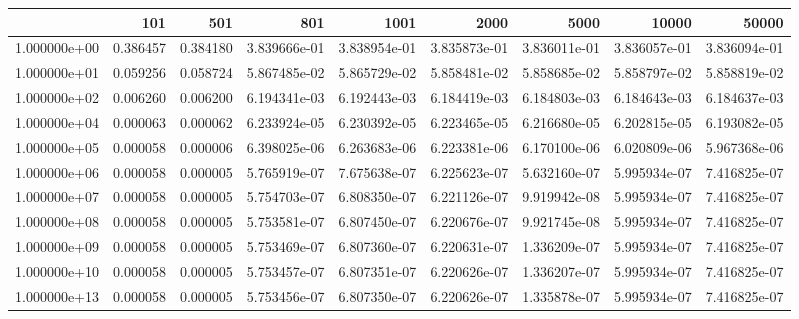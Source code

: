 \begin{tabular}{lrrrrrrrr}
\toprule
{} &     101   &     501   &         801   &         1001  &         2000  &         5000  &         10000 &         50000 \\
\midrule
1.000000e+00 &  0.386457 &  0.384180 &  3.839666e-01 &  3.838954e-01 &  3.835873e-01 &  3.836011e-01 &  3.836057e-01 &  3.836094e-01 \\
1.000000e+01 &  0.059256 &  0.058724 &  5.867485e-02 &  5.865729e-02 &  5.858481e-02 &  5.858685e-02 &  5.858797e-02 &  5.858819e-02 \\
1.000000e+02 &  0.006260 &  0.006200 &  6.194341e-03 &  6.192443e-03 &  6.184419e-03 &  6.184803e-03 &  6.184643e-03 &  6.184637e-03 \\
1.000000e+04 &  0.000063 &  0.000062 &  6.233924e-05 &  6.230392e-05 &  6.223465e-05 &  6.216680e-05 &  6.202815e-05 &  6.193082e-05 \\
1.000000e+05 &  0.000058 &  0.000006 &  6.398025e-06 &  6.263683e-06 &  6.223381e-06 &  6.170100e-06 &  6.020809e-06 &  5.967368e-06 \\
1.000000e+06 &  0.000058 &  0.000005 &  5.765919e-07 &  7.675638e-07 &  6.225623e-07 &  5.632160e-07 &  5.995934e-07 &  7.416825e-07 \\
1.000000e+07 &  0.000058 &  0.000005 &  5.754703e-07 &  6.808350e-07 &  6.221126e-07 &  9.919942e-08 &  5.995934e-07 &  7.416825e-07 \\
1.000000e+08 &  0.000058 &  0.000005 &  5.753581e-07 &  6.807450e-07 &  6.220676e-07 &  9.921745e-08 &  5.995934e-07 &  7.416825e-07 \\
1.000000e+09 &  0.000058 &  0.000005 &  5.753469e-07 &  6.807360e-07 &  6.220631e-07 &  1.336209e-07 &  5.995934e-07 &  7.416825e-07 \\
1.000000e+10 &  0.000058 &  0.000005 &  5.753457e-07 &  6.807351e-07 &  6.220626e-07 &  1.336207e-07 &  5.995934e-07 &  7.416825e-07 \\
1.000000e+13 &  0.000058 &  0.000005 &  5.753456e-07 &  6.807350e-07 &  6.220626e-07 &  1.335878e-07 &  5.995934e-07 &  7.416825e-07 \\
\bottomrule
\end{tabular}
